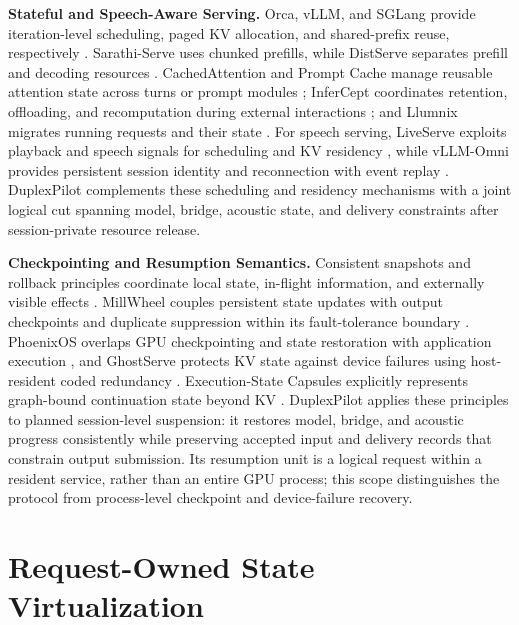 \documentclass{article}
\begin{document}
\noindent\textbf{Stateful and Speech-Aware Serving.}
Orca, vLLM, and SGLang provide iteration-level scheduling, paged KV
allocation, and shared-prefix reuse, respectively
\citep{orca2022,vllm2023,sglang2024}.
Sarathi-Serve uses chunked prefills, while DistServe separates prefill
and decoding resources \citep{sarathi2024,distserve2024}.
CachedAttention and Prompt Cache manage reusable attention state across
turns or prompt modules \citep{cachedattention2024,promptcache2024};
InferCept coordinates retention, offloading, and recomputation during
external interactions \citep{infercept2024}; and Llumnix migrates running
requests and their state \citep{llumnix2024}.
For speech serving, LiveServe exploits playback and speech signals
for scheduling and KV residency \citep{liveserve2026}, while
vLLM-Omni provides persistent session identity and reconnection with
event replay \citep{omnidoc}.
DuplexPilot complements these scheduling and residency mechanisms
with a joint logical cut spanning model, bridge, acoustic state, and
delivery constraints after session-private resource release.

\noindent\textbf{Checkpointing and Resumption Semantics.}
Consistent snapshots and rollback principles coordinate local state,
in-flight information, and externally visible effects
\citep{chandy1985,elnozahy2002}.
MillWheel couples persistent state updates with output checkpoints
and duplicate suppression within its fault-tolerance boundary
\citep{millwheel2013}.
PhoenixOS overlaps GPU checkpointing and state restoration with application
execution \citep{phoenixos2025}, and GhostServe protects KV state
against device failures using host-resident coded redundancy
\citep{ghostserve2026}.
Execution-State Capsules explicitly represents graph-bound continuation
state beyond KV \citep{capsules2026}.
DuplexPilot applies these principles to planned session-level
suspension: it restores model, bridge, and acoustic progress
consistently while preserving accepted input and delivery records
that constrain output submission.
Its resumption unit is a logical request within a resident service,
rather than an entire GPU process; this scope distinguishes the
protocol from process-level checkpoint and device-failure recovery.


\section{Request-Owned State Virtualization}
\label{sec:design}
\end{document}
